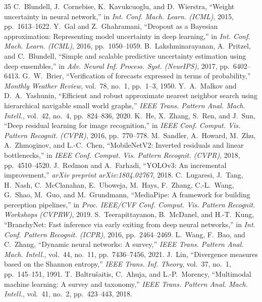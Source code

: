 \documentclass[10pt,journal,compsoc]{IEEEtran}
\begin{document}
\begin{thebibliography}{35}
 C.~Blundell, J.~Cornebise, K.~Kavukcuoglu, and D.~Wierstra, ``Weight uncertainty in neural network,'' in \emph{Int. Conf. Mach. Learn. (ICML)}, 2015, pp.~1613--1622.
 Y.~Gal and Z.~Ghahramani, ``Dropout as a Bayesian approximation: Representing model uncertainty in deep learning,'' in \emph{Int. Conf. Mach. Learn. (ICML)}, 2016, pp.~1050--1059.
 B.~Lakshminarayanan, A.~Pritzel, and C.~Blundell, ``Simple and scalable predictive uncertainty estimation using deep ensembles,'' in \emph{Adv. Neural Inf. Process. Syst. (NeurIPS)}, 2017, pp.~6402--6413.
 G.~W.~Brier, ``Verification of forecasts expressed in terms of probability,'' \emph{Monthly Weather Review}, vol.~78, no.~1, pp.~1--3, 1950.
 Y.~A.~Malkov and D.~A.~Yashunin, ``Efficient and robust approximate nearest neighbor search using hierarchical navigable small world graphs,'' \emph{IEEE Trans. Pattern Anal. Mach. Intell.}, vol.~42, no.~4, pp.~824--836, 2020.
 K.~He, X.~Zhang, S.~Ren, and J.~Sun, ``Deep residual learning for image recognition,'' in \emph{IEEE Conf. Comput. Vis. Pattern Recognit. (CVPR)}, 2016, pp.~770--778.
 M.~Sandler, A.~Howard, M.~Zhu, A.~Zhmoginov, and L.-C.~Chen, ``MobileNetV2: Inverted residuals and linear bottlenecks,'' in \emph{IEEE Conf. Comput. Vis. Pattern Recognit. (CVPR)}, 2018, pp.~4510--4520.
 J.~Redmon and A.~Farhadi, ``YOLOv3: An incremental improvement,'' \emph{arXiv preprint arXiv:1804.02767}, 2018.
 C.~Lugaresi, J.~Tang, H.~Nash, C.~McClanahan, E.~Uboweja, M.~Hays, F.~Zhang, C.-L.~Wang, G.~Shao, M.~Guo, and M.~Grundmann, ``MediaPipe: A framework for building perception pipelines,'' in \emph{Proc. IEEE/CVF Conf. Comput. Vis. Pattern Recognit. Workshops (CVPRW)}, 2019.
 S.~Teerapittayanon, B.~McDanel, and H.-T.~Kung, ``BranchyNet: Fast inference via early exiting from deep neural networks,'' in \emph{Int. Conf. Pattern Recognit. (ICPR)}, 2016, pp.~2464--2469.
 L.~Wang, F.~Bao, and C.~Zhang, ``Dynamic neural networks: A survey,'' \emph{IEEE Trans. Pattern Anal. Mach. Intell.}, vol.~44, no.~11, pp.~7436--7456, 2021.
 J.~Lin, ``Divergence measures based on the Shannon entropy,'' \emph{IEEE Trans. Inf. Theory}, vol.~37, no.~1, pp.~145--151, 1991.
 T.~Baltru{\v{s}}aitis, C.~Ahuja, and L.-P.~Morency, ``Multimodal machine learning: A survey and taxonomy,'' \emph{IEEE Trans. Pattern Anal. Mach. Intell.}, vol.~41, no.~2, pp.~423--443, 2018.

\end{thebibliography}
\end{document}
